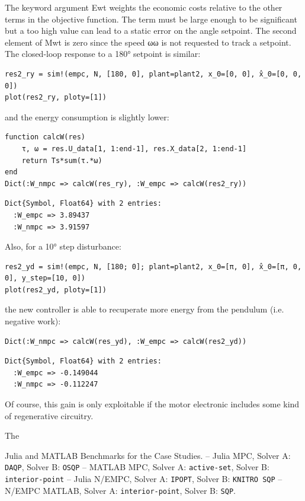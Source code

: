 The keyword argument Ewt weights the economic costs relative to the other terms in the objective function. The term must be large enough to be significant but a too high value can lead to a static error on the angle setpoint. The second element of Mwt is zero since the speed ωω is not requested to track a setpoint. The closed-loop response to a 180° setpoint is similar:

\begin{verbatim}
res2_ry = sim!(empc, N, [180, 0], plant=plant2, x_0=[0, 0], x̂_0=[0, 0, 0])
plot(res2_ry, ploty=[1])
\end{verbatim}

and the energy consumption is slightly lower:

\begin{verbatim}
function calcW(res)
    τ, ω = res.U_data[1, 1:end-1], res.X_data[2, 1:end-1]
    return Ts*sum(τ.*ω)
end
Dict(:W_nmpc => calcW(res_ry), :W_empc => calcW(res2_ry))
\end{verbatim}
\spacerepl
\begin{verbatim}
Dict{Symbol, Float64} with 2 entries:
  :W_empc => 3.89437
  :W_nmpc => 3.91597
\end{verbatim}

Also, for a 10° step disturbance:

\begin{verbatim}
res2_yd = sim!(empc, N, [180; 0]; plant=plant2, x_0=[π, 0], x̂_0=[π, 0, 0], y_step=[10, 0])
plot(res2_yd, ploty=[1])
\end{verbatim}

the new controller is able to recuperate more energy from the pendulum (i.e. negative work):

\begin{verbatim}
Dict(:W_nmpc => calcW(res_yd), :W_empc => calcW(res2_yd))
\end{verbatim}
\spacerepl
\begin{verbatim}
Dict{Symbol, Float64} with 2 entries:
  :W_empc => -0.149044
  :W_nmpc => -0.112247
\end{verbatim}

Of course, this gain is only exploitable if the motor electronic includes some kind of regenerative circuitry.

The 



\begin{table}
    \centering
    \caption{Julia and MATLAB Benchmarks for the Case Studies. -- Julia MPC, Solver A: \texttt{DAQP}, Solver B: \texttt{OSQP} -- MATLAB MPC, Solver A: \texttt{active-set}, Solver B: \texttt{interior-point} -- Julia N/EMPC, Solver A: \texttt{IPOPT}, Solver B: \texttt{KNITRO SQP} -- N/EMPC MATLAB, Solver A: \texttt{interior-point}, Solver B: \texttt{SQP}.}
    \label{tab:benchamrks}
    \centering
	
\end{table}

